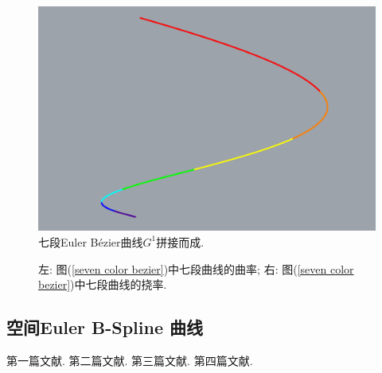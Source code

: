 \documentclass[utf8]{ctexart} %
\begin{document}
\begin{figure}[ht]
\begin{minipage}[b]{0.45\textwidth}
	 		\includegraphics[width=\textwidth]{figures/Seven_Color_Bezier_Right.png}
	 	\end{minipage}
	 	\caption{七段Euler B\'ezier曲线$G^1$拼接而成. }
	 \end{figure}
 	\begin{figure}[ht]
 		\centering
 		\label{seven color bezier_table}
 		\begin{minipage}[b]{0.45\textwidth} %
 			\centering
 			
 		\end{minipage}\hfill
 		\begin{minipage}[b]{0.45\textwidth} %
 			\centering
 			
 		\end{minipage}
 		\caption{左: 图(\ref{seven color bezier})中七段曲线的曲率; 右: 图(\ref{seven color bezier})中七段曲线的挠率. }
 	\end{figure}
	 
	 
	 \subsection{空间Euler B-Spline 曲线}
		
		
		\renewcommand\refname{参考文献}
		\begin{thebibliography}{100}%
				第一篇文献.
				第二篇文献.
				第三篇文献.
				第四篇文献.
		\end{thebibliography}  
\end{document}

